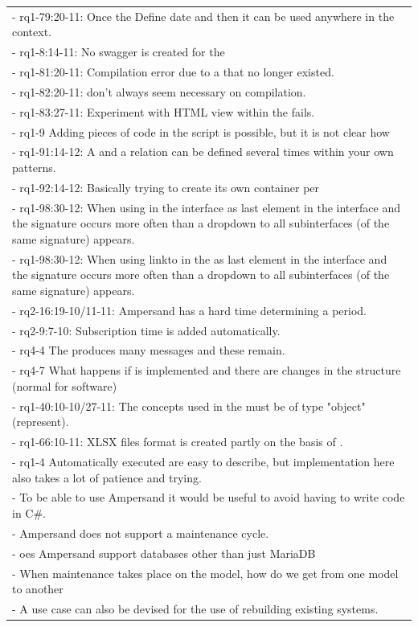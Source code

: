 \begin{xltabular}{\textwidth}{|X|}
-	rq1-79:20-11: Once the  Define date and then it can be used anywhere in the context.	\\
-	rq1-8:14-11: No swagger is created for the 	\\
-	rq1-81:20-11: Compilation error due to a  that no longer existed.	\\
-	rq1-82:20-11:  don't always seem necessary on compilation.	\\
-	rq1-83:27-11: Experiment with HTML view within the  fails.	\\
-	rq1-9 Adding pieces of  code in the script is possible, but it is not clear how	\\
-	rq1-91:14-12: A  and a {relation} can be defined several times within your own patterns.	\\
-	rq1-92:14-12: Basically trying to create its own container per 	\\
-	rq1-98:30-12: When using  in the {interface} as last element in the interface and the signature occurs more often than a dropdown to all subinterfaces (of the same signature) appears.	\\
-	rq1-98:30-12: When using {linkto} in the  as last element in the interface and the signature occurs more often than a dropdown to all subinterfaces (of the same signature) appears.	\\
-	rq2-16:19-10/11-11: Ampersand has a hard time determining a period.	\\
-	rq2-9:7-10: Subscription time is added automatically.	\\
-	rq4-4 The  produces many messages and these remain.	\\
-	rq4-7 What happens if  is implemented and there are changes in the structure (normal for software)	\\
-	 rq1-40:10-10/27-11: The concepts used in the  must be of type "object" (represent).	\\
-	 rq1-66:10-11: XLSX files format is created partly on the basis of .	\\
-	 rq1-4 Automatically executed  are easy to describe, but implementation here also takes a lot of patience and trying.	\\
-	To be able to use Ampersand it would be useful to avoid having to write code in C\#.	\\
-	Ampersand does not support a maintenance cycle.	\\
-	oes Ampersand support databases other than just MariaDB	\\
-	When maintenance takes place on the model, how do we get from one model to another	\\
-	A use case can also be devised for the use of rebuilding existing systems. 	\\
\end{xltabular}

